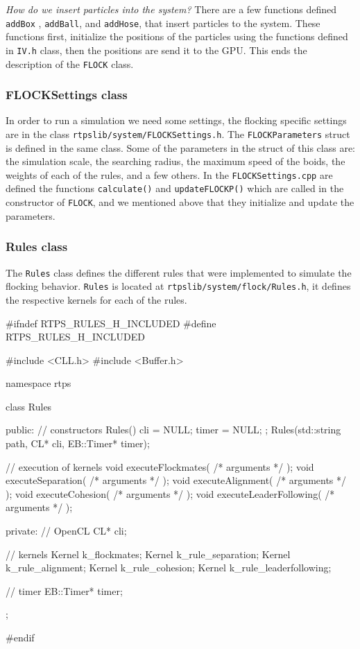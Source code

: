 \textit{How do we insert particles into the system?} There are a few functions defined \texttt{addBox} , \texttt{addBall}, and \texttt{addHose}, that insert particles to the system. These functions first, initialize the positions of the particles using the functions defined in \texttt{IV.h} class, then the positions are send it to the GPU. This ends the description of the \texttt{FLOCK} class.
 
\subsubsection{FLOCKSettings class}
In order to run a simulation we need some settings, the flocking specific settings are in the class \texttt{rtpslib/system/FLOCKSettings.h}. The \texttt{FLOCKParameters} struct is defined in the same class. Some of the parameters in the struct of this class are: the simulation scale, the searching radius, the maximum speed of the boids, the weights of each of the rules, and a few others. In the \texttt{FLOCKSettings.cpp} are defined the functions \texttt{calculate()} and \texttt{updateFLOCKP()} which are called in the constructor of \texttt{FLOCK}, and we mentioned above that they initialize and update the parameters.

\subsubsection{Rules class}
The \texttt{Rules} class defines the different rules that were implemented to simulate the flocking behavior. \texttt{Rules} is located at \texttt{rtpslib/system/flock/Rules.h}, it defines the respective kernels for each of the rules.

\begin{cppcode}{0}
#ifndef RTPS_RULES_H_INCLUDED
#define RTPS_RULES_H_INCLUDED

#include <CLL.h>
 #include <Buffer.h>

namespace rtps
 {
	class Rules
	{
		public:
			// constructors
			Rules() { cli = NULL; timer = NULL; };
			Rules(std::string path, CL* cli, EB::Timer* timer);
			
			// execution of kernels
			void executeFlockmates( /* arguments */ );
			void executeSeparation( /* arguments */ );
			void executeAlignment( /* arguments */ );
			void executeCohesion( /* arguments */ );
			void executeLeaderFollowing( /* arguments */ );
			
		private:
			// OpenCL
			CL* cli;
			
			// kernels
			Kernel k_flockmates;
			Kernel k_rule_separation;
			Kernel k_rule_alignment;
			Kernel k_rule_cohesion;
			Kernel k_rule_leaderfollowing;
			
			// timer
			EB::Timer* timer;
	};
}
#endif
\end{cppcode}

